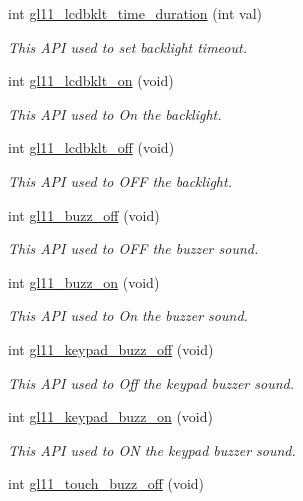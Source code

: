 \begin{DoxyCompactItemize}
int \hyperlink{group__A_gad9e349138f3450631a117d36ea31c20a}{gl11\+\_\+lcdbklt\+\_\+time\+\_\+duration} (int val)
\begin{DoxyCompactList}\small\item\em This A\+P\+I used to set backlight timeout. \end{DoxyCompactList}\item 
int \hyperlink{group__A_ga13839a610d5db6b320792a10f89df5a9}{gl11\+\_\+lcdbklt\+\_\+on} (void)
\begin{DoxyCompactList}\small\item\em This A\+P\+I used to On the backlight. \end{DoxyCompactList}\item 
int \hyperlink{group__A_ga5180b5491124c52075bd2398a2617449}{gl11\+\_\+lcdbklt\+\_\+off} (void)
\begin{DoxyCompactList}\small\item\em This A\+P\+I used to O\+F\+F the backlight. \end{DoxyCompactList}\item 
int \hyperlink{group__A_ga25e5b5ddaa856a414cf93c4098cb97c6}{gl11\+\_\+buzz\+\_\+off} (void)
\begin{DoxyCompactList}\small\item\em This A\+P\+I used to O\+F\+F the buzzer sound. \end{DoxyCompactList}\item 
int \hyperlink{group__A_gab2aca7aa79008a26b13c0b6644170b2f}{gl11\+\_\+buzz\+\_\+on} (void)
\begin{DoxyCompactList}\small\item\em This A\+P\+I used to On the buzzer sound. \end{DoxyCompactList}\item 
int \hyperlink{group__A_ga582145ae5b419d838870a9caa497f4bb}{gl11\+\_\+keypad\+\_\+buzz\+\_\+off} (void)
\begin{DoxyCompactList}\small\item\em This A\+P\+I used to Off the keypad buzzer sound. \end{DoxyCompactList}\item 
int \hyperlink{group__A_gac4d32b8fe2ea4568b090bc95fa527712}{gl11\+\_\+keypad\+\_\+buzz\+\_\+on} (void)
\begin{DoxyCompactList}\small\item\em This A\+P\+I used to O\+N the keypad buzzer sound. \end{DoxyCompactList}\item 
int \hyperlink{group__A_ga8300037e60997084ce36bc159a210849}{gl11\+\_\+touch\+\_\+buzz\+\_\+off} (void)

\end{DoxyCompactItemize}
